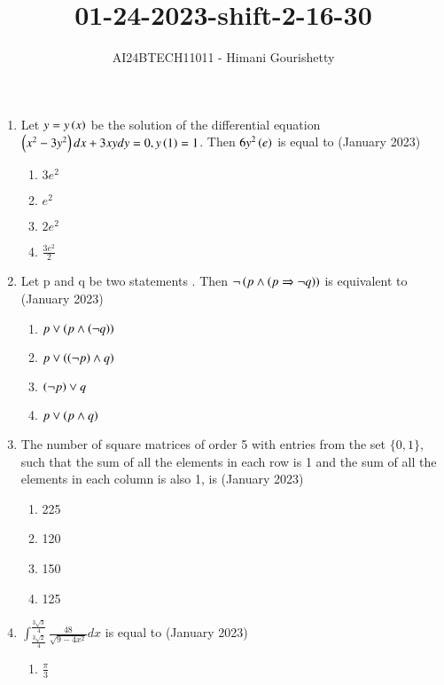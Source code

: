 \documentclass[journal,12pt,onecolumn]{IEEEtran}
\theoremstyle{remark}
\begin{document}

\vspace{3cm}

\title{01-24-2023-shift-2-16-30}
\author{AI24BTECH11011 - Himani Gourishetty}
\maketitle
\bigskip

\renewcommand{\thefigure}{\theenumi}
\renewcommand{\thetable}{\theenumi}
\begin{enumerate}
\item Let $y = y\left(x\right)$ be the solution of the differential
equation $\left(x^2-3y^2\right)dx + 3xy dy = 0, y\left(1\right) = 1$. Then
$6y^2\left(e\right)$ is equal to
	\hfill{(January 2023)}
	\begin{enumerate}
    \item $3e^2$
    \item $e^2$
    \item $2e^2$
    \item $\frac{3e^2}{2}$
\end{enumerate}
\item Let p and q be two statements . Then $\neg \left(p \land \left(p \Rightarrow \neg q\right)\right)$ is equivalent to
\hfill{(January 2023)}
\begin{enumerate}
    \item $p \lor \left(p \land \left(\neg q\right)\right)$
    \item $p \lor \left(\left(\neg p\right) \land q\right)$
    \item $\left(\neg p\right) \lor q$
    \item $p \lor \left(p \land q\right)$
\end{enumerate}
\item The number of square matrices of order 5 with
entries from the set $\{0, 1\}$, such that the sum of all
the elements in each row is 1 and the sum of all the
elements in each column is also 1, is
\hfill{(January 2023)}
\begin{enumerate}
    \item 225
    \item 120
    \item 150
    \item 125
\end{enumerate}
\item $\int_{\frac{3\sqrt{2}}{4}}^{\frac{3\sqrt{3}}{4}}\frac{48}{\sqrt{9-4x^2}}dx$ is equal to
\hfill{(January 2023)}
\begin{enumerate}
    \item $\frac{\pi}{3}$

\end{enumerate}
\end{enumerate}
\end{document}
